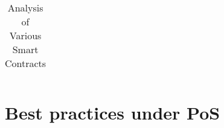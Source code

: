 \begin{table}[H]
\begin{tabularx}{\textwidth}{L{3.5cm}L{3.5cm}C{0.5cm}C{0.5cm}X}
\end{tabularx}
\caption{Analysis of Various Smart Contracts}
\label{tab:smart_contracts}
\end{table}
%
%
%
%
%
%
%

\section{Best practices under PoS}

